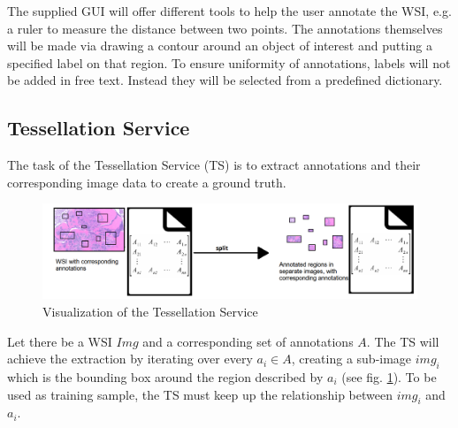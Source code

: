 The supplied GUI will offer different tools to help the user annotate the WSI, e.g. a ruler to measure the distance between two points. The annotations themselves will be made via drawing a contour around an object of interest and putting a specified label on that region. To ensure uniformity of annotations, labels will not be added in free text. Instead they will be selected from a predefined dictionary.


\subsection{Tessellation Service}
\label{sec2_ts}
The task of the Tessellation Service (TS) is to extract annotations and their corresponding image data to create a ground truth.

\begin{figure}[H]
	\begin{center}
		\includegraphics[scale=0.25]{img/processChainC.png}
		\caption{Visualization of the Tessellation Service}
		\label{fig2_processChainC}
	\end{center}
\end{figure}

Let there be a WSI $Img$ and a corresponding set of annotations $A$. The TS will achieve the extraction by iterating over every $a_i \in A$, creating a sub-image $img_i$ which is the bounding box around the region described by $a_i$ (see fig. \ref{fig2_processChainC}). To be used as training sample, the TS must keep up the relationship between $img_i$ and $a_i$.